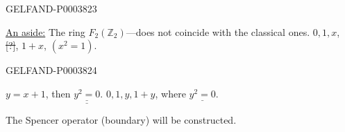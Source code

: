 \begin{GelfandAdjacentEvidence}{GELFAND-P000382}{3}

\underline{An aside:}
The ring $F_2(\mathbb Z_2)$---does not coincide with the classical ones.
$0,1, x$, \sout{[?]}, $1+x$, $(x^2=1)$.
\end{GelfandAdjacentEvidence}
\begin{GelfandAdjacentEvidence}{GELFAND-P000382}{4}

$y=x+1$, then $\underline{\underline{y^2=0}}$.
$0,1, y,1+y$, where $\underline{y^2=0}$.
\begin{center}\end{center}
The Spencer operator (boundary) will be constructed.




\end{GelfandAdjacentEvidence}
